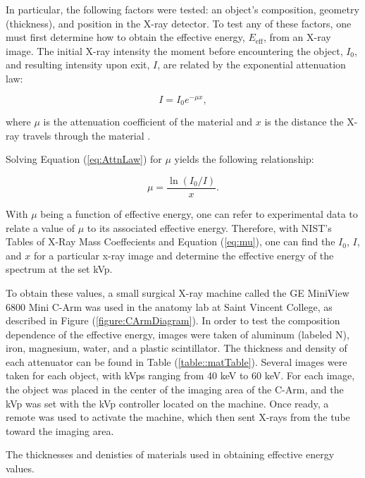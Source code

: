 In particular, the following factors were tested: an object's composition, geometry (thickness), and position in the X-ray detector. To test any of these factors, one must first determine how to obtain the effective energy, $E_{\text{eff}}$, from an X-ray image. The initial X-ray intensity the moment before encountering the object, $I_0$, and resulting intensity upon exit, $I$, are related by the exponential attenuation law:

\begin{equation}
    I = I_0e^{-\mu x},
\label{eq:AttnLaw}
\end{equation}

\noindent where $\mu$ is the attenuation coefficient of the material and $x$ is the distance the X-ray travels through the material \cite{AttnCoef}.

Solving Equation (\ref{eq:AttnLaw}) for $\mu$ yields the following relationship:

\begin{equation}
    \mu = \frac{\ln{(I_0/I)}}{x}.
\label{eq:mu}
\end{equation}

With $\mu$ being a function of effective energy, one can refer to experimental data to relate a value of $\mu$ to its associated effective energy. Therefore, with NIST's Tables of X-Ray Mass Coeffecients \cite{AttnCoef} and Equation (\ref{eq:mu}), one can find the $I_0$, $I$, and $x$ for a particular x-ray image and determine the effective energy of the spectrum at the set kVp.

To obtain these values, a small surgical X-ray machine called the GE MiniView 6800 Mini C-Arm was used in the anatomy lab at Saint Vincent College, as described in Figure (\ref{figure:CArmDiagram}). In order to test the composition dependence of the effective energy, images were taken of aluminum (labeled N), iron, magnesium, water, and a plastic scintillator. The thickness and density of each attenuator can be found in Table (\ref{table::matTable}).  Several images were taken for each object, with kVps ranging from 40 keV to 60 keV. For each image, the object was placed in the center of the imaging area of the C-Arm, and the kVp was set with the kVp controller located on the machine. Once ready, a remote was used to activate the machine, which then sent X-rays from the tube toward the imaging area.

\begin{table}[H]
	\centering
    
    \caption{The thicknesses and denisties of materials used in obtaining effective energy values.}
    \label{table::matTable}
\end{table}


